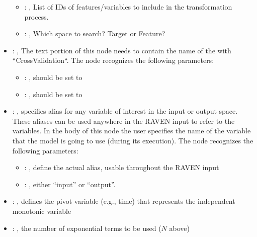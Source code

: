 \begin{itemize}
\begin{itemize}
        \item {}: ,
          List of IDs of features/variables to include in the transformation process.

        \item {}: ,
          Which space to search? Target or Feature?
      \end{itemize}

    \item {}: ,
      The text portion of this node needs to contain the name of the  with
               ``CrossValidation``.
      The  node recognizes the following parameters:
        \begin{itemize}
          \item {}: ,
            should be set to 
          \item {}: ,
            should be set to 
      \end{itemize}

    \item {}: ,
      specifies alias for         any variable of interest in the input or output space. These
      aliases can be used anywhere in the RAVEN input to         refer to the variables. In the body
      of this node the user specifies the name of the variable that the model is going to use
      (during its execution).
      The  node recognizes the following parameters:
        \begin{itemize}
          \item {}: ,
            define the actual alias, usable throughout the RAVEN input
          \item {}: ,
            either ``input'' or ``output''.
      \end{itemize}

    \item {}: ,
      defines the pivot variable (e.g., time) that represents the
      independent monotonic variable

    \item {}: ,
      the number of exponential terms to be used ($N$ above)


\end{itemize}
